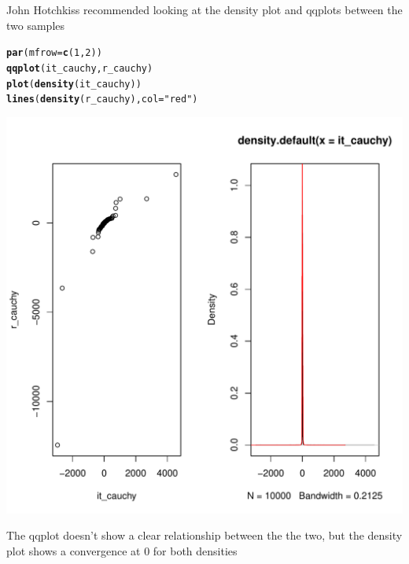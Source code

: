 \documentclass{article}\usepackage[]{graphicx}\usepackage[]{color}
\makeatletter
\newcommand{\hlnum}[1]{\textcolor[rgb]{0.686,0.059,0.569}{#1}}%
\newcommand{\hlstr}[1]{\textcolor[rgb]{0.192,0.494,0.8}{#1}}%
\newcommand{\hlstd}[1]{\textcolor[rgb]{0.345,0.345,0.345}{#1}}%
\newcommand{\hlkwc}[1]{\textcolor[rgb]{0.333,0.667,0.333}{#1}}%
\newcommand{\hlkwd}[1]{\textcolor[rgb]{0.737,0.353,0.396}{\textbf{#1}}}%
\newenvironment{kframe}{%
 \def\at@end@of@kframe{}%
 \ifinner\ifhmode%
  \def\at@end@of@kframe{\end{minipage}}%
  \begin{minipage}{\columnwidth}%
 \fi\fi%
 \def\FrameCommand##1{\hskip\@totalleftmargin \hskip-\fboxsep
 \colorbox{shadecolor}{##1}\hskip-\fboxsep
     \hskip-\linewidth \hskip-\@totalleftmargin \hskip\columnwidth}%
 \MakeFramed {\advance\hsize-\width
   \@totalleftmargin\z@ \linewidth\hsize
   \@setminipage}}%
 {\par\unskip\endMakeFramed%
 \at@end@of@kframe}
\newenvironment{knitrout}{}{} %
\makeatother
\begin{document}
John Hotchkiss recommended looking at the density plot and qqplots between the two samples
\begin{knitrout}
\color{fgcolor}\begin{kframe}
\begin{alltt}
\hlkwd{par}\hlstd{(}\hlkwc{mfrow}\hlstd{=}\hlkwd{c}\hlstd{(}\hlnum{1}\hlstd{,}\hlnum{2}\hlstd{))}
\hlkwd{qqplot}\hlstd{(it_cauchy, r_cauchy)}
\hlkwd{plot}\hlstd{(}\hlkwd{density}\hlstd{(it_cauchy))}
\hlkwd{lines}\hlstd{(}\hlkwd{density}\hlstd{(r_cauchy),} \hlkwc{col} \hlstd{=} \hlstr{"red"}\hlstd{)}
\end{alltt}
\end{kframe}
\includegraphics[width=0.50\linewidth]{figure/unnamed-chunk-4-1} 

\end{knitrout}
The qqplot doesn't show a clear relationship between the the two, but the density plot shows a convergence at 0 for both densities
\end{document}
